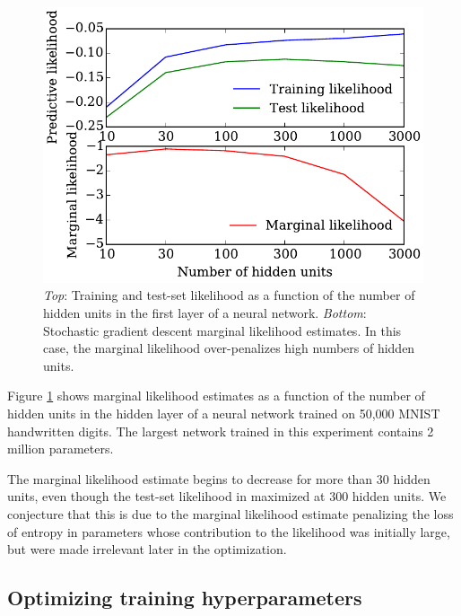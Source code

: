 \documentclass[]{article}
\begin{document}
\begin{figure}[h!]
\begin{center}
\includegraphics[width=\columnwidth]{../experiments/2015_03_03_vary_width/7_hidden_units_higher_learnrate/vary_widths.pdf}
\vskip -0.1in
\caption{\emph{Top}: Training and test-set likelihood as a function of the number of hidden units in the first layer of a neural network.
\emph{Bottom}: Stochastic gradient descent marginal likelihood estimates.
In this case, the marginal likelihood over-penalizes high numbers of hidden units. 
}
\label{fig:num hiddens}
\end{center}
\end{figure}

Figure \ref{fig:num hiddens} shows marginal likelihood estimates as a function of the number of hidden units in the hidden layer of a neural network trained on 50,000 MNIST handwritten digits.
The largest network trained in this experiment contains 2 million parameters.

The marginal likelihood estimate begins to decrease for more than 30 hidden units, even though the test-set likelihood in maximized at 300 hidden units.
We conjecture that this is due to the marginal likelihood estimate penalizing the loss of entropy in parameters whose contribution to the likelihood was initially large, but were made irrelevant later in the optimization.

\subsection{Optimizing training hyperparameters}
\end{document}
